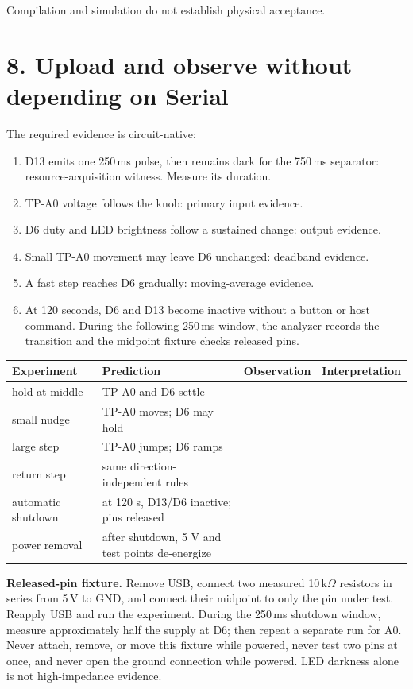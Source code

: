 \documentclass[11pt]{article}
\begin{document}
Compilation and simulation do not establish physical acceptance.

\section*{8. Upload and observe without depending on Serial}


The required evidence is circuit-native:

\begin{enumerate}
    \item D13 emits one 250\,ms pulse, then remains dark for the 750\,ms
          separator: resource-acquisition witness. Measure its duration.
    \item TP-A0 voltage follows the knob: primary input evidence.
    \item D6 duty and LED brightness follow a sustained change: output evidence.
    \item Small TP-A0 movement may leave D6 unchanged: deadband evidence.
    \item A fast step reaches D6 gradually: moving-average evidence.
    \item At 120 seconds, D6 and D13 become inactive without a button or host
          command. During the following 250\,ms window, the analyzer records
          the transition and the midpoint fixture checks released pins.
\end{enumerate}

\begin{center}
\begin{tabularx}{\linewidth}{@{}lXXX@{}}
\toprule
Experiment & Prediction & Observation & Interpretation\\
\midrule
hold at middle & TP-A0 and D6 settle & &\\
small nudge & TP-A0 moves; D6 may hold & &\\
large step & TP-A0 jumps; D6 ramps & &\\
return step & same direction-independent rules & &\\
automatic shutdown & at 120 s, D13/D6 inactive; pins released & &\\
power removal & after shutdown, 5 V and test points de-energize & &\\
\bottomrule
\end{tabularx}
\end{center}

\textbf{Released-pin fixture.} Remove USB, connect two measured
10\,k\(\Omega\) resistors in series from 5\,V to GND, and connect their
midpoint to only the pin under test. Reapply USB and run the experiment.
During the 250\,ms shutdown window, measure approximately half the supply at
D6; then repeat a separate run for A0. Never attach, remove, or move this
fixture while powered, never test two pins at once, and never open the ground
connection while powered. LED darkness alone is not high-impedance evidence.
\end{document}
